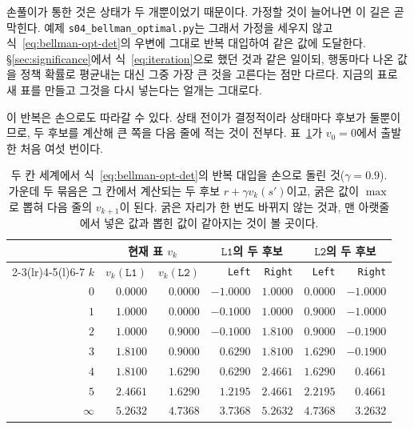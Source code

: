 \documentclass[11pt,a4paper]{article}
\newcommand{\Lone}{\texttt{L1}}
\newcommand{\Ltwo}{\texttt{L2}}
\begin{document}
손풀이가 통한 것은 상태가 두 개뿐이었기 때문이다. 가정할 것이 늘어나면 이 길은 곧 막힌다. 예제
\texttt{s04\_bellman\_optimal.py}는 그래서 가정을 세우지 않고 식~\eqref{eq:bellman-opt-det}의 우변에
그대로 반복 대입하여 같은 값에 도달한다. \S\ref{sec:significance}에서 식~\eqref{eq:iteration}으로 했던
것과 같은 일이되, 행동마다 나온 값을 정책 확률로 평균내는 대신 그중 가장 큰 것을 고른다는 점만 다르다.
지금의 표로 새 표를 만들고 그것을 다시 넣는다는 얼개는 그대로다.

이 반복은 손으로도 따라갈 수 있다. 상태 전이가 결정적이라 상태마다 후보가 둘뿐이므로, 두 후보를
계산해 큰 쪽을 다음 줄에 적는 것이 전부다. 표~\ref{tab:opt-iter}가 $v_0=0$에서 출발한 처음 여섯 번이다.

\begin{table}[htbp]
\centering
\caption{두 칸 세계에서 식~\eqref{eq:bellman-opt-det}의 반복 대입을 손으로 돌린 것($\gamma=0.9$). 가운데 두 묶음은 그 칸에서
계산되는 두 후보 $r+\gamma v_k(s')$이고, 굵은 값이 $\max$로 뽑혀 다음 줄의 $v_{k+1}$이 된다. 굵은 자리가
한 번도 바뀌지 않는 것과, 맨 아랫줄에서 넣은 값과 뽑힌 값이 같아지는 것이 볼 곳이다.}
\label{tab:opt-iter}
\small
\begin{tabular}{@{}rrrrrrr@{}}
\toprule
 & \multicolumn{2}{c}{현재 표 $v_k$} & \multicolumn{2}{c}{$\Lone$의 두 후보} & \multicolumn{2}{c}{$\Ltwo$의 두 후보} \\
\cmidrule(r){2-3}\cmidrule(lr){4-5}\cmidrule(l){6-7}
$k$ & $v_k(\Lone)$ & $v_k(\Ltwo)$ & \texttt{Left} & \texttt{Right} & \texttt{Left} & \texttt{Right} \\
\midrule
$0$ & $0.0000$ & $0.0000$ & $-1.0000$ & $\mathbf{1.0000}$ & $\mathbf{0.0000}$ & $-1.0000$ \\
$1$ & $1.0000$ & $0.0000$ & $-0.1000$ & $\mathbf{1.0000}$ & $\mathbf{0.9000}$ & $-1.0000$ \\
$2$ & $1.0000$ & $0.9000$ & $-0.1000$ & $\mathbf{1.8100}$ & $\mathbf{0.9000}$ & $-0.1900$ \\
$3$ & $1.8100$ & $0.9000$ & $0.6290$  & $\mathbf{1.8100}$ & $\mathbf{1.6290}$ & $-0.1900$ \\
$4$ & $1.8100$ & $1.6290$ & $0.6290$  & $\mathbf{2.4661}$ & $\mathbf{1.6290}$ & $0.4661$ \\
$5$ & $2.4661$ & $1.6290$ & $1.2195$  & $\mathbf{2.4661}$ & $\mathbf{2.2195}$ & $0.4661$ \\
\midrule
$\infty$ & $5.2632$ & $4.7368$ & $3.7368$ & $\mathbf{5.2632}$ & $\mathbf{4.7368}$ & $3.2632$ \\
\bottomrule
\end{tabular}
\end{table}
\end{document}
